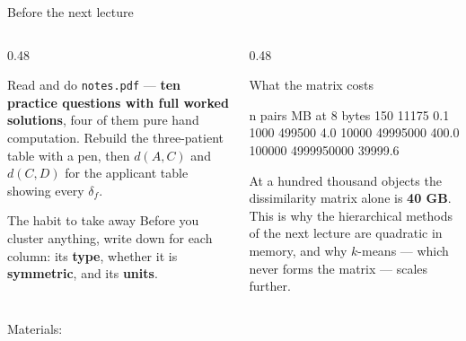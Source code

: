 \documentclass[aspectratio=169]{beamer}
\begin{document}
\begin{frame}[fragile,shrink=14]{Before the next lecture}
  \begin{columns}[T]
    \begin{column}{0.48\textwidth}
      \begin{block}{Read and do}
        \texttt{notes.pdf} --- \textbf{ten practice questions with full
        worked solutions}, four of them pure hand computation. Rebuild the
        three-patient table with a pen, then $d(A,C)$ and $d(C,D)$ for the
        applicant table showing every $\delta_f$.
      \end{block}
      \begin{exampleblock}{The habit to take away}
        Before you cluster anything, write down for each column: its
        \textbf{type}, whether it is \textbf{symmetric}, and its
        \textbf{units}.
      \end{exampleblock}
    \end{column}
    \begin{column}{0.48\textwidth}
      \begin{alertblock}{What the matrix costs}
\begin{outblk}
         n              pairs   MB at 8 bytes
       150              11175             0.1
      1000             499500             4.0
     10000           49995000           400.0
    100000         4999950000         39999.6
\end{outblk}
        At a hundred thousand objects the dissimilarity matrix alone is
        \textbf{40 GB}. This is why the hierarchical methods of the next
        lecture are quadratic in memory, and why $k$-means --- which never
        forms the matrix --- scales further.
      \end{alertblock}
    \end{column}
  \end{columns}
  \begin{center}
    \small Materials: \texttt{\AMLRepoURL}
  \end{center}
  \slidesources{\AMLUnitVIISources}
\end{frame}
\end{document}
